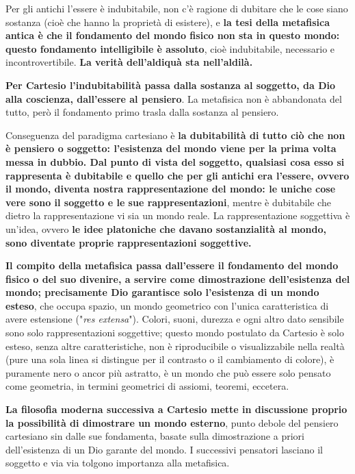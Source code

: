 Per gli antichi l'essere è indubitabile, non c'è ragione di dubitare che le cose siano sostanza (cioè che hanno la proprietà di esistere), e \textbf{la tesi della metafisica antica è che il fondamento del mondo fisico non sta in questo mondo: questo fondamento intelligibile è assoluto}, cioè indubitabile, necessario e incontrovertibile. \textbf{La verità dell'aldiquà sta nell'aldilà.}

\textbf{Per Cartesio l'indubitabilità passa dalla sostanza al soggetto, da Dio alla coscienza, dall'essere al pensiero}. La metafisica non è abbandonata del tutto, però il fondamento primo trasla dalla sostanza al pensiero.

Conseguenza del paradigma cartesiano è \textbf{la dubitabilità di tutto ciò che non è pensiero o soggetto: l'esistenza del mondo viene per la prima volta messa in dubbio. Dal punto di vista del soggetto, qualsiasi cosa esso si rappresenta è dubitabile e quello che per gli antichi era l'essere, ovvero il mondo, diventa nostra rappresentazione del mondo: le uniche cose vere sono il soggetto e le sue rappresentazioni}, mentre è dubitabile che dietro la rappresentazione vi sia un mondo reale. La rappresentazione soggettiva è un'idea, ovvero \textbf{le idee platoniche che davano sostanzialità al mondo, sono diventate proprie rappresentazioni soggettive.}

\textbf{Il compito della metafisica passa dall'essere il fondamento del mondo fisico o del suo divenire, a servire come dimostrazione dell'esistenza del mondo; precisamente Dio garantisce solo l'esistenza di un mondo esteso}, che occupa spazio, un mondo geometrico con l'unica caratteristica di avere estensione ("\textit{res extensa}"). Colori, suoni, durezza e ogni altro dato sensibile sono solo rappresentazioni soggettive; questo mondo postulato da Cartesio è solo esteso, senza altre caratteristiche, non è riproducibile o visualizzabile nella realtà (pure una sola linea si distingue per il contrasto o il cambiamento di colore), è puramente nero o ancor più astratto, è un mondo che può essere solo pensato come geometria, in termini geometrici di assiomi, teoremi, eccetera.

\textbf{La filosofia moderna successiva a Cartesio mette in discussione proprio la possibilità di dimostrare un mondo esterno}, punto debole del pensiero cartesiano sin dalle sue fondamenta, basate sulla dimostrazione a priori dell'esistenza di un Dio garante del mondo. I successivi pensatori lasciano il soggetto e via via tolgono importanza alla metafisica.

